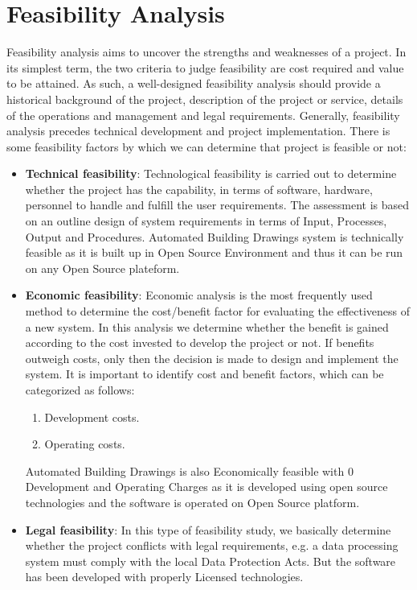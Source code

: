 \section{Feasibility Analysis}
Feasibility analysis aims to uncover the strengths and weaknesses of 
a project. In its simplest term, the two criteria to judge feasibility 
are cost required and value to be attained. As such, a well-designed 
feasibility analysis should provide a historical background of the 
project, description of the project or service, details of the 
operations and management and legal requirements. Generally, feasibility 
analysis precedes technical development and project implementation. 
There is some feasibility factors by which we can determine that 
project is feasible or not:
\begin{itemize}
\item {\bf{Technical feasibility}}: Technological feasibility is carried 
out to determine whether the project has the capability, in terms of 
software, hardware, personnel to handle and fulfill the user 
requirements. The assessment is based on an outline design of system 
requirements in terms of Input, Processes, Output and Procedures. Automated Building Drawings system is technically feasible as it is built up in Open 
Source Environment and thus it can be run on any Open Source plateform.
\item {\bf{Economic feasibility}}: Economic analysis is the most 
frequently used method to determine the cost/benefit factor for 
evaluating the effectiveness of a new system. In this analysis we 
determine whether the benefit is gained according to the cost invested 
to develop the project or not. If benefits outweigh costs, only then 
the decision is made to design and implement the system. It is 
important to identify cost and benefit factors, which can be categorized 
as follows:
\begin{enumerate}
\item Development costs.
\item Operating costs.
\end{enumerate}
Automated Building Drawings is also Economically feasible with 0 Development 
and Operating Charges as it is developed using open source technologies and the software is operated on Open 
Source platform.
\item {\bf {Legal feasibility}}: In this type of feasibility study, we 
basically determine whether the project conflicts with legal 
requirements, e.g. a data processing system must comply with the local 
Data Protection Acts. But the software has been developed with properly Licensed technologies. 

\end{itemize}
